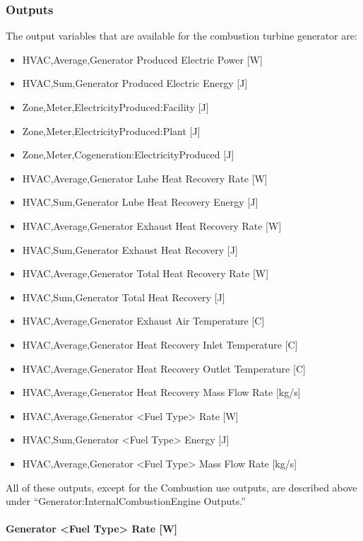 \subsubsection{Outputs}\label{outputs-6-002}

The output variables that are available for the combustion turbine generator are:

\begin{itemize}
\item
  HVAC,Average,Generator Produced Electric Power {[}W{]}
\item
  HVAC,Sum,Generator Produced Electric Energy {[}J{]}
\item
  Zone,Meter,ElectricityProduced:Facility {[}J{]}
\item
  Zone,Meter,ElectricityProduced:Plant {[}J{]}
\item
  Zone,Meter,Cogeneration:ElectricityProduced {[}J{]}
\item
  HVAC,Average,Generator Lube Heat Recovery Rate {[}W{]}
\item
  HVAC,Sum,Generator Lube Heat Recovery Energy {[}J{]}
\item
  HVAC,Average,Generator Exhaust Heat Recovery Rate {[}W{]}
\item
  HVAC,Sum,Generator Exhaust Heat Recovery {[}J{]}
\item
  HVAC,Average,Generator Total Heat Recovery Rate {[}W{]}
\item
  HVAC,Sum,Generator Total Heat Recovery {[}J{]}
\item
  HVAC,Average,Generator Exhaust Air Temperature {[}C{]}
\item
  HVAC,Average,Generator Heat Recovery Inlet Temperature {[}C{]}
\item
  HVAC,Average,Generator Heat Recovery Outlet Temperature {[}C{]}
\item
  HVAC,Average,Generator Heat Recovery Mass Flow Rate {[}kg/s{]}
\item
  HVAC,Average,Generator \textless{}Fuel Type\textgreater{} Rate {[}W{]}
\item
  HVAC,Sum,Generator \textless{}Fuel Type\textgreater{} Energy {[}J{]}
\item
  HVAC,Average,Generator \textless{}Fuel Type\textgreater{} Mass Flow Rate {[}kg/s{]}
\end{itemize}

All of these outputs, except for the Combustion use outputs, are described above under ``Generator:InternalCombustionEngine Outputs.''

\paragraph{Generator \textless{}Fuel Type\textgreater{} Rate {[}W{]}}\label{generator-fuel-type-rate-w-1}

